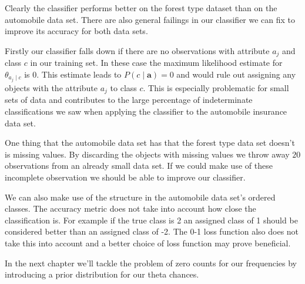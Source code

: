 Clearly the classifier performs better on the forest type dataset than on the automobile data set.
There are also general failings in our classifier we can fix to improve its accuracy for both data sets.

Firstly our classifier falls down if there are no observations with attribute $a_j$ and class $c$ in our training set.
In these case the maximum likelihood estimate for $\theta_{a_j \mid c}$ is $0$.
This estimate leads to $P(c \mid \mathbf{a}) = 0$ and would rule out assigning any objects with the attribute $a_j$ to class $c$.
This is especially problematic for small sets of data and contributes to the large percentage of indeterminate classifications we saw when applying the classifier to the automobile insurance data set.

One thing that the automobile data set has that the forest type data set doesn't is missing values.
By discarding the objects with missing values we throw away $20$ observations from an already small data set.
If we could make use of these incomplete observation we should be able to improve our classifier.

We can also make use of the structure in the automobile data set's ordered classes.
The accuracy metric does not take into account how close the classification is.
For example if the true class is 2 an assigned class of 1 should be considered better than an assigned class of -2.
The 0-1 loss function also does not take this into account and a better choice of loss function may prove beneficial.

In the next chapter we'll tackle the problem of zero counts for our frequencies by introducing a prior distribution for our theta chances.